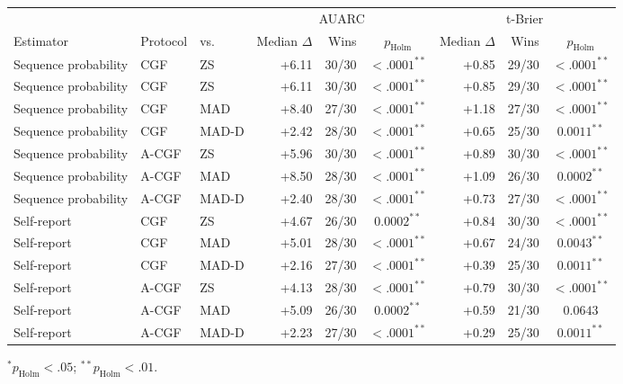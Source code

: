\noindent
\begin{minipage}{\textwidth}
\centering
\small
\begin{threeparttable}

\begin{tabular}{lllrrcrrc}
\toprule
& & & \multicolumn{3}{c}{AUARC} & \multicolumn{3}{c}{t-Brier} \\
Estimator & Protocol & vs. & Median $\Delta$ & Wins & $p_{\mathrm{Holm}}$ & Median $\Delta$ & Wins & $p_{\mathrm{Holm}}$ \\
\midrule
Sequence probability & CGF & ZS & +6.11 & 30/30 & $<.0001^{**}$ & +0.85 & 29/30 & $<.0001^{**}$ \\
Sequence probability & CGF & ZS & +6.11 & 30/30 & $<.0001^{**}$ & +0.85 & 29/30 & $<.0001^{**}$ \\
Sequence probability & CGF & MAD & +8.40 & 27/30 & $<.0001^{**}$ & +1.18 & 27/30 & $<.0001^{**}$ \\
Sequence probability & CGF & MAD-D & +2.42 & 28/30 & $<.0001^{**}$ & +0.65 & 25/30 & $0.0011^{**}$ \\
Sequence probability & A-CGF & ZS & +5.96 & 30/30 & $<.0001^{**}$ & +0.89 & 30/30 & $<.0001^{**}$ \\
Sequence probability & A-CGF & MAD & +8.50 & 28/30 & $<.0001^{**}$ & +1.09 & 26/30 & $0.0002^{**}$ \\
Sequence probability & A-CGF & MAD-D & +2.40 & 28/30 & $<.0001^{**}$ & +0.73 & 27/30 & $<.0001^{**}$ \\
Self-report & CGF & ZS & +4.67 & 26/30 & $0.0002^{**}$ & +0.84 & 30/30 & $<.0001^{**}$ \\
Self-report & CGF & MAD & +5.01 & 28/30 & $<.0001^{**}$ & +0.67 & 24/30 & $0.0043^{**}$ \\
Self-report & CGF & MAD-D & +2.16 & 27/30 & $<.0001^{**}$ & +0.39 & 25/30 & $0.0011^{**}$ \\
Self-report & A-CGF & ZS & +4.13 & 28/30 & $<.0001^{**}$ & +0.79 & 30/30 & $<.0001^{**}$ \\
Self-report & A-CGF & MAD & +5.09 & 26/30 & $0.0002^{**}$ & +0.59 & 21/30 & $0.0643$ \\
Self-report & A-CGF & MAD-D & +2.23 & 27/30 & $<.0001^{**}$ & +0.29 & 25/30 & $0.0011^{**}$ \\


\bottomrule
\end{tabular}
\begin{tablenotes}[flushleft]\footnotesize
\item $^{*}p_{\mathrm{Holm}}<.05$; $^{**}p_{\mathrm{Holm}}<.01$.
\end{tablenotes}
\end{threeparttable}
\label{tab:significance}
\end{minipage}

